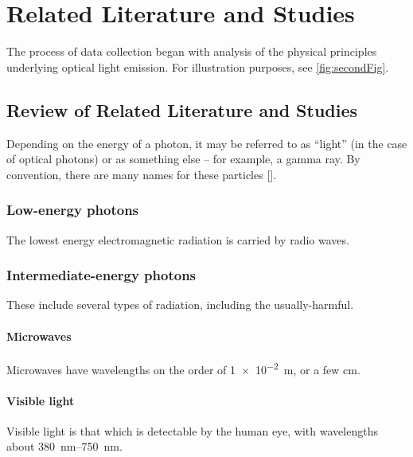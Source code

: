 
\chapter{Related Literature and Studies}
\begin{refsection}

The process of data collection began with analysis of the physical principles underlying optical light emission. For illustration purposes, see \ref{fig:secondFig}.

\section{Review of Related Literature and Studies}


Depending on the energy of a photon, it may be referred to as ``light'' (in the case of optical photons) or as something else -- for example, a gamma ray. By convention, there are many names for these particles \citeauthor{allen2019fast} [\citeyear{allen2019fast}].

\subsection{Low-energy photons}

The lowest energy electromagnetic radiation is carried by radio waves.

\subsection{Intermediate-energy photons}

These include several types of radiation, including the usually-harmful.

\subsubsection{Microwaves}

Microwaves have wavelengths on the order of \SI{1e-2}{\meter}, or a few \si{\centi\meter}.

\subsubsection{Visible light}

Visible light is that which is detectable by the human eye, with wavelengths about \SIrange{380}{750}{\nano\meter}.


\end{refsection}
